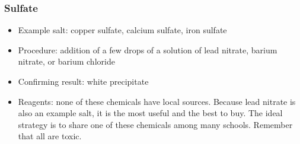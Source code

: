 \subsubsection{Sulfate}
\begin{itemize}
\item{Example salt: copper sulfate, 
calcium sulfate, 
iron sulfate}
\item{Procedure: addition of a few drops of a solution of lead nitrate, 
barium nitrate, 
or barium chloride}
\item{Confirming result: white precipitate}
\item{Reagents: none of these chemicals have local sources. 
Because lead nitrate is also an example salt, 
it is the most useful and the best to buy. 
The ideal strategy is to share one of these chemicals among many schools. 
Remember that all are toxic.}
\end{itemize}
